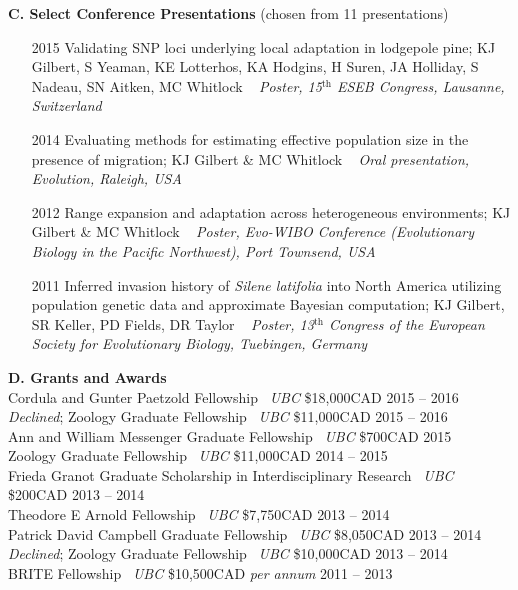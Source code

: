 \noindent \textbf{C.  Select Conference Presentations} (chosen from 11 presentations)
\vspace{2pt}	
\begin{enumerate}[nolistsep]

\item[2015] Validating SNP loci underlying local adaptation in lodgepole pine; KJ Gilbert, S Yeaman, KE Lotterhos, KA Hodgins, H Suren, JA Holliday, S Nadeau, SN Aitken, MC Whitlock ~ \emph{Poster, 15$^{\textrm{th}}$ ESEB Congress, Lausanne, Switzerland}
	
\item[2014] Evaluating methods for estimating effective population size in the presence of migration; KJ Gilbert \& MC Whitlock ~ \emph{Oral presentation, Evolution, Raleigh, USA}

\item[2012] Range expansion and adaptation across heterogeneous environments; KJ Gilbert \& MC Whitlock ~ \emph{Poster, Evo-WIBO Conference (Evolutionary Biology in the Pacific Northwest), Port Townsend, USA}

\item[2011] Inferred invasion history of \emph{Silene latifolia} into North America utilizing population genetic data and approximate Bayesian computation; KJ Gilbert, SR Keller, PD Fields, DR Taylor ~ \emph{Poster, 13$^{\textrm{th}}$ Congress of the European Society for Evolutionary Biology, Tuebingen, Germany}

\end{enumerate}	
	
\vspace{4pt}	

\noindent
\textbf{D.  Grants and Awards}\\
\vspace{2pt}	
\textmd{Cordula and Gunter Paetzold Fellowship ~\emph{UBC} \$18,000CAD} \hfill {2015 -- 2016}\\
\textmd{\emph{Declined}; Zoology Graduate Fellowship ~\emph{UBC} \$11,000CAD} \hfill {2015 -- 2016}\\
\textmd{Ann and William Messenger Graduate Fellowship ~\emph{UBC} \$700CAD} \hfill {2015}\\
\textmd{Zoology Graduate Fellowship ~\emph{UBC} \$11,000CAD} \hfill {2014 -- 2015}\\
\textmd{Frieda Granot Graduate Scholarship in Interdisciplinary Research ~\emph{UBC} \$200CAD} \hfill {2013 -- 2014}\\
\textmd{Theodore E Arnold Fellowship ~\emph{UBC} \$7,750CAD} \hfill {2013 -- 2014}\\
\textmd{Patrick David Campbell Graduate Fellowship ~\emph{UBC} \$8,050CAD} \hfill {2013 -- 2014}\\
\textmd{\emph{Declined}; Zoology Graduate Fellowship ~\emph{UBC} \$10,000CAD} \hfill {2013 -- 2014}\\
\textmd{BRITE Fellowship ~\emph{UBC} \$10,500CAD \emph{per annum}} \hfill {2011 -- 2013}\\


